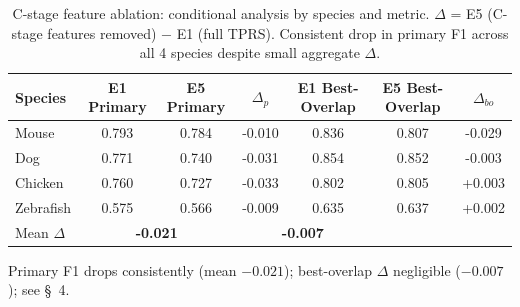 \begin{table}[t]
\centering
\caption{C-stage feature ablation: conditional analysis by species and metric. $\Delta$ = E5 (C-stage features removed) $-$ E1 (full TPRS). Consistent drop in primary F1 across all 4 species despite small aggregate $\Delta$.}
\label{tab:s5_cstage_conditional}
\footnotesize
\setlength{\tabcolsep}{2.5pt}
\begin{tabular}{lcccccc}
\toprule
Species & E1 Primary & E5 Primary & $\Delta_p$ & E1 Best-Overlap & E5 Best-Overlap & $\Delta_{bo}$ \\
\midrule
Mouse & 0.793 & 0.784 & -0.010 & 0.836 & 0.807 & -0.029 \\
Dog & 0.771 & 0.740 & -0.031 & 0.854 & 0.852 & -0.003 \\
Chicken & 0.760 & 0.727 & -0.033 & 0.802 & 0.805 & +0.003 \\
Zebrafish & 0.575 & 0.566 & -0.009 & 0.635 & 0.637 & +0.002 \\
\midrule
Mean $\Delta$ & \multicolumn{2}{c}{\textbf{-0.021}} & \multicolumn{2}{c}{\textbf{-0.007}} \\
\bottomrule
\end{tabular}
\vspace{2pt}
\footnotesize Primary F1 drops consistently (mean $-0.021$); best-overlap $\Delta$ negligible ($-0.007$); see \S~4.
\end{table}